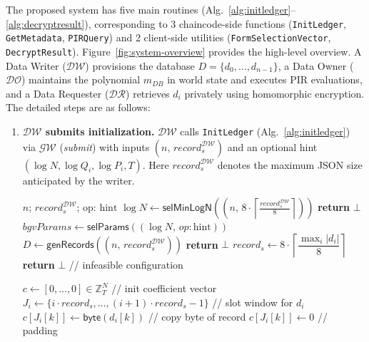 \documentclass[letterpaper,journal]{IEEEtran}
\newcommand{\selMinLogN}[1]{\mathsf{selMinLogN}\!\left(#1\right)}
\newcommand{\selParams}[1]{\mathsf{selParams}\!\left(#1\right)}
\newcommand{\genRecords}[1]{\mathsf{genRecords}\!\left(#1\right)}
\newcommand{\feasible}[1]{\mathsf{feasible}\!\left(#1\right)}
\begin{document}
The proposed system has five main routines (Alg.~\ref{alg:initledger}–\ref{alg:decryptresult}), corresponding to 3 chaincode-side functions 
(\texttt{InitLedger}, \texttt{GetMetadata}, \texttt{PIRQuery}) and 2 client-side utilities (\texttt{FormSelectionVector}, \texttt{DecryptResult}). 
Figure~\ref{fig:system-overview} provides the high-level overview. 
A Data Writer ($\mathcal{DW}$) provisions the database $D=\{d_0,\dots,d_{n-1}\}$, 
a Data Owner ($\mathcal{DO}$) maintains the polynomial \emph{$m_{DB}$} in world state and executes PIR evaluations, 
and a Data Requester ($\mathcal{DR}$) retrieves $d_i$ privately using homomorphic encryption.
The detailed steps are as follows:
\begin{enumerate}
    \item \textbf{$\mathcal{DW}$ submits initialization.}  
    $\mathcal{DW}$ calls \texttt{InitLedger} (Alg.~\ref{alg:initledger}) via $\mathcal{GW}$ (\emph{submit}) 
    with inputs $(n,\,record_{s}^{\mathcal{DW}})$ and an optional hint $(\log N,\log Q_i,\log P_i,T)$. 
    Here $record_{s}^{\mathcal{DW}}$ denotes the maximum JSON size anticipated by the writer. 

    \begin{algorithm}[!htbp]
      \caption{\texttt{InitLedger} (chaincode)}
      \label{alg:initledger}
      \begin{algorithmic}[1]
      \REQUIRE $n$; $record_s^{\mathcal{DW}}$; op: $\mathrm{hint}$
      \STATE $\log N \leftarrow \selMinLogN{\!\left(n,\,8 \cdot \left\lceil \tfrac{record_s^{\mathcal{DW}}}{8} \right\rceil\right)}$
          \STATE \textbf{return} $\bot$ 
      \ENDIF
      \STATE $bgvParams \gets \selParams{(\log N,\, op:\mathrm{hint})}$
      \STATE $D \gets \genRecords{(n,\,record_s^{\mathcal{DW}})}$
          \STATE \textbf{return} $\bot$ 
      \ENDIF
      \STATE $record_s \gets 8 \cdot \left\lceil \dfrac{\max_i |d_i|}{8} \right\rceil$
      \IF{$\neg \feasible{\log N,n,record_s}$} 
          \STATE \textbf{return} $\bot$ // infeasible configuration
      \ENDIF

      \STATE $c \gets [0,\dots,0] \in \mathbb{Z}_T^N$ \hfill // init coefficient vector
          \STATE $J_i \gets \{i\cdot record_s,\dots,(i+1)\cdot record_s-1\}$ \hfill // slot window for $d_i$
                  \STATE $c[J_i[k]] \gets \textsf{byte}(d_i[k])$ \hfill // copy byte of record
              \ELSE
                  \STATE $c[J_i[k]] \gets 0$ \hfill // padding
              \ENDIF
          \ENDFOR
      \ENDFOR


\end{algorithmic}
\end{algorithm}
\end{enumerate}
\end{document}
